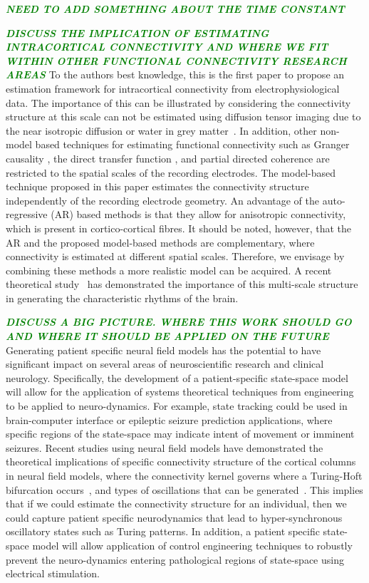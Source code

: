 \documentclass[12pt]{iopart}
\newcommand{\omg}[1]{\textsf{\emph{\textbf{\textcolor{green}{#1}}}}}
\begin{document}
\omg{NEED TO ADD SOMETHING ABOUT THE TIME CONSTANT }

\omg{DISCUSS THE IMPLICATION OF ESTIMATING INTRACORTICAL CONNECTIVITY AND WHERE WE FIT WITHIN OTHER FUNCTIONAL CONNECTIVITY RESEARCH AREAS}
To the authors best knowledge, this is the first paper to propose an estimation framework for intracortical connectivity from electrophysiological data. The importance of this can be illustrated by considering the connectivity structure at this scale can not be estimated using diffusion tensor imaging due to the near isotropic diffusion or water in grey matter~\cite{Assaf2008}. In addition, other non-model based techniques for estimating functional connectivity such as Granger causality \cite{Hesse2003}, the direct transfer function \cite{Kaminski1991}, and partial directed coherence \cite{Sameshima1999} are restricted to the spatial scales of the recording electrodes. The model-based technique proposed in this paper estimates the connectivity structure independently of the recording electrode geometry. An advantage of the auto-regressive (AR) based methods is that they allow for anisotropic connectivity, which is present in cortico-cortical fibres. It should be noted, however, that the AR and the proposed model-based methods are complementary, where connectivity is estimated at different spatial scales. Therefore, we envisage by combining these methods a more realistic model can be acquired. A recent theoretical study~\cite{Jirsa2009} has demonstrated the importance of this multi-scale structure in generating the characteristic rhythms of the brain.

\omg{DISCUSS A BIG PICTURE. WHERE THIS WORK SHOULD GO AND WHERE IT SHOULD BE APPLIED ON THE FUTURE}
Generating patient specific neural field models has the potential to have significant impact on several areas of neuroscientific research and clinical neurology. Specifically, the development of a patient-specific state-space model will allow for the application of systems theoretical techniques from engineering to be applied to neuro-dynamics. For example, state tracking could be used in brain-computer interface or epileptic seizure prediction applications, where specific regions of the state-space may indicate intent of movement or imminent seizures. Recent studies using neural field models have demonstrated the theoretical implications of specific connectivity structure of the cortical columns in neural field models, where the connectivity kernel governs where a Turing-Hoft bifurcation occurs~\cite{Hutt2005}, and types of oscillations that can be generated~\cite{Schmidt2009}. This implies that if we could estimate the connectivity structure for an individual, then we could capture patient specific neurodynamics that lead to hyper-synchronous oscillatory states such as Turing patterns. In addition, a patient specific state-space model will allow application of control engineering techniques to robustly prevent the neuro-dynamics entering pathological regions of state-space using electrical stimulation. 
\end{document}
